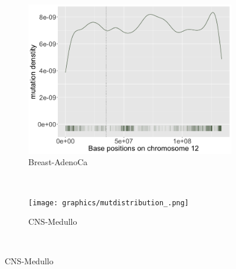 \begin{figure}[h!]
    \begin{subfigure}{.5\textwidth}
    \includegraphics[width=\linewidth,height=0.7\textwidth]{graphics/mutdistribution_Breast-AdenoCa.png}
    \caption{Breast-AdenoCa}
    \end{subfigure}
    ~
    \begin{subfigure}{.5\textwidth}
    \texttt{[image: graphics/mutdistribution\_.png]}
    \caption{CNS-Medullo}
    \end{subfigure} \\
    \vspace{0.5cm}
    

\end{figure}
